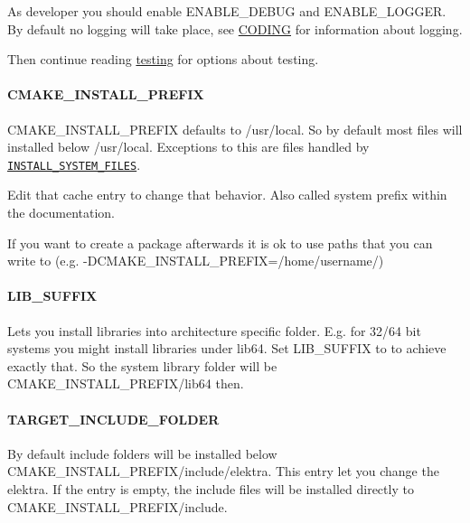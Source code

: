 As developer you should enable {\ttfamily E\+N\+A\+B\+L\+E\+\_\+\+D\+E\+B\+UG} and {\ttfamily E\+N\+A\+B\+L\+E\+\_\+\+L\+O\+G\+G\+ER}. By default no logging will take place, see \hyperlink{doc_CODING_md}{C\+O\+D\+I\+NG} for information about logging.

Then continue reading \hyperlink{doc_TESTING_md}{testing} for options about testing.

\paragraph*{C\+M\+A\+K\+E\+\_\+\+I\+N\+S\+T\+A\+L\+L\+\_\+\+P\+R\+E\+F\+IX}

{\ttfamily C\+M\+A\+K\+E\+\_\+\+I\+N\+S\+T\+A\+L\+L\+\_\+\+P\+R\+E\+F\+IX} defaults to {\ttfamily /usr/local}. So by default most files will installed below {\ttfamily /usr/local}. Exceptions to this are files handled by \href{#install_system_files}{\tt I\+N\+S\+T\+A\+L\+L\+\_\+\+S\+Y\+S\+T\+E\+M\+\_\+\+F\+I\+L\+ES}.

Edit that cache entry to change that behavior. Also called system prefix within the documentation.

If you want to create a package afterwards it is ok to use paths that you can write to (e.\+g. {\ttfamily -\/\+D\+C\+M\+A\+K\+E\+\_\+\+I\+N\+S\+T\+A\+L\+L\+\_\+\+P\+R\+E\+F\+IX=/home/username/})

\paragraph*{L\+I\+B\+\_\+\+S\+U\+F\+F\+IX}

Lets you install libraries into architecture specific folder. E.\+g. for 32/64 bit systems you might install libraries under {\ttfamily lib64}. Set {\ttfamily L\+I\+B\+\_\+\+S\+U\+F\+F\+IX} to {} to achieve exactly that. So the system library folder will be {\ttfamily C\+M\+A\+K\+E\+\_\+\+I\+N\+S\+T\+A\+L\+L\+\_\+\+P\+R\+E\+F\+I\+X/lib64} then.

\paragraph*{T\+A\+R\+G\+E\+T\+\_\+\+I\+N\+C\+L\+U\+D\+E\+\_\+\+F\+O\+L\+D\+ER}

By default include folders will be installed below {\ttfamily C\+M\+A\+K\+E\+\_\+\+I\+N\+S\+T\+A\+L\+L\+\_\+\+P\+R\+E\+F\+I\+X/include/elektra}. This entry let you change the elektra. If the entry is empty, the include files will be installed directly to {\ttfamily C\+M\+A\+K\+E\+\_\+\+I\+N\+S\+T\+A\+L\+L\+\_\+\+P\+R\+E\+F\+I\+X/include}.

